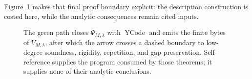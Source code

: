 Figure~\ref{fig:C-selfref-boundary} makes that final proof boundary explicit:
the description construction is costed here, while the analytic consequences
remain cited inputs.
\begin{figure}[H]
\centering

\caption{The green path closes \(\Psi_{M,\lambda}\) with \(\operatorname{YCode}\) and emits the finite bytes of \(\overline{V_{M,\lambda}}\), after which the arrow crosses a dashed boundary to low-degree soundness, rigidity, repetition, and gap preservation.  Self-reference supplies the program consumed by those theorems; it supplies none of their analytic conclusions.}
\label{fig:C-selfref-boundary}
\end{figure}

\clearpage

